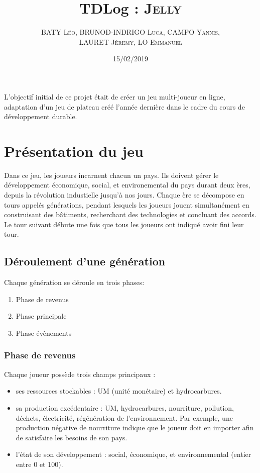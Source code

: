 \documentclass[12pt,twoside,a4paper]{article}
\title{TDLog : \textsc{Jelly}}
\author{\textsc{BATY L\'eo, BRUNOD-INDRIGO Luca, CAMPO Yannis,}\\ \textsc{LAURET J\'eremy, LO Emmanuel}}
\date{15/02/2019}
\begin{document}
\maketitle

\tableofcontents

\newpage%

L'objectif initial de ce projet \'etait de cr\'eer un jeu multi-joueur en ligne, adaptation d'un jeu de plateau cr\'e\'e l'ann\'ee derni\`ere dans le cadre du cours de d\'eveloppement durable. 

\section{Pr\'esentation du jeu}

Dans ce jeu, les joueurs incarnent chacun un pays. Ils doivent g\'erer le d\'eveloppement \'economique, social, et environemental du pays durant deux \`eres, depuis la r\'evolution industielle jusqu'\`a nos jours. Chaque \`ere se d\'ecompose en tours appel\'es g\'en\'erations, pendant lesquels les joueurs jouent simultan\'ement en construisant des b\^atiments, recherchant des technologies et concluant des accords. Le tour suivant débute une fois que tous les joueurs ont indiqué avoir fini leur tour.

\subsection{D\'eroulement d'une g\'en\'eration}
\noindent Chaque g\'en\'eration se d\'eroule en trois phases:

\begin{enumerate}
\item Phase de revenus
\item Phase principale
\item Phase \'ev\`enements
\end{enumerate}

\subsubsection{Phase de revenus}

Chaque joueur poss\`ede trois champs principaux :
\begin{itemize}
\item ses ressources stockables : UM (unit\'e mon\'etaire) et hydrocarbures.
\item sa production exc\'edentaire : UM, hydrocarbures, nourriture, pollution, d\'echets, \'electricit\'e, r\'eg\'en\'eration de l'environnement. Par exemple, une production n\'egative de nourriture indique que le joueur doit en importer afin de satisfaire les besoins de son pays.
\item l'\'etat de son d\'eveloppement : social, \'economique, et environnemental (entier entre 0 et 100).\\
\end{itemize}
\end{document}

